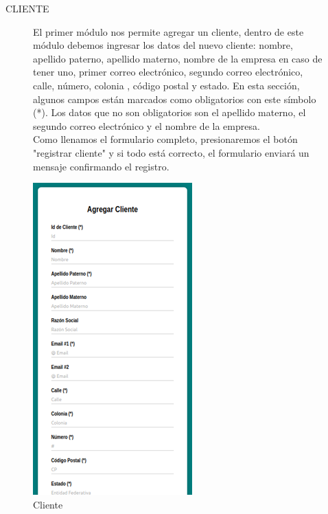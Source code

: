 \documentclass{article}
\begin{document}
\begin{center}
CLIENTE
\end{center}
\begin{figure}[ht]
\begin{minipage}[t]{0.5\linewidth}
\bigskip
\bigskip
\bigskip
\bigskip
\bigskip
\bigskip

El primer módulo nos permite agregar un cliente, dentro de este módulo debemos ingresar los datos del nuevo cliente: nombre, apellido paterno, apellido materno, nombre de la empresa en caso de tener uno, primer correo electrónico, segundo correo electrónico, calle, número, colonia , código postal y estado. En esta sección, algunos campos están marcados como obligatorios con este símbolo (*). Los datos que no son obligatorios son el apellido materno, el segundo correo electrónico y el nombre de la empresa. \\

Como llenamos el formulario completo, presionaremos el botón "registrar cliente" y si todo está correcto, el formulario enviará un mensaje confirmando el registro. \\
\end{minipage}
\begin{minipage}[t]{0.5\linewidth}
\caption {Cliente}
\centering
\includegraphics[scale=1]{fig5}
\end{minipage}
\end{figure}

\pagebreak
\end{document}
